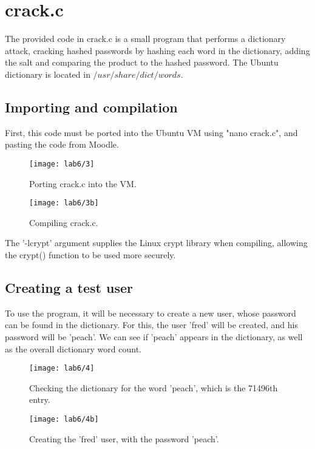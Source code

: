 \section{crack.c}\label{sec:crack.c}
The provided code in crack.c is a small program that performs a dictionary attack,
cracking hashed passwords by hashing each word in the dictionary, adding the salt
and comparing the product to the hashed password.
The Ubuntu dictionary is located in $/usr/share/dict/words$.

\subsection{Importing and compilation}\label{subsec:importing-and-compilation}
First, this code must be ported into the Ubuntu VM using "nano crack.c", and pasting the code from Moodle.

\begin{figure}[H]
    \centering
    \texttt{[image: lab6/3]}
    \caption{Porting crack.c into the VM.}
    \label{fig:nanoCrackC}
\end{figure}

\begin{figure}[H]
    \centering
    \texttt{[image: lab6/3b]}
    \caption{Compiling crack.c.}
    \label{fig:compile}
\end{figure}

The '-lcrypt' argument supplies the Linux crypt library when compiling, allowing the crypt() function
to be used more securely.

\pagebreak

\subsection{Creating a test user}\label{subsec:creating-a-test-user}
To use the program, it will be necessary to create a new user, whose password can be found in the dictionary.
For this, the user 'fred' will be created, and his password will be 'peach'.
We can see if 'peach' appears in the dictionary, as well as the overall dictionary word count.

\begin{figure}[H]
    \centering
    \texttt{[image: lab6/4]}
    \caption{Checking the dictionary for the word 'peach', which is the 71496th entry.}
    \label{fig:checkDict}
\end{figure}

\begin{figure}[H]
    \centering
    \texttt{[image: lab6/4b]}
    \caption{Creating the 'fred' user, with the password 'peach'.}
    \label{fig:createFred}
\end{figure}

